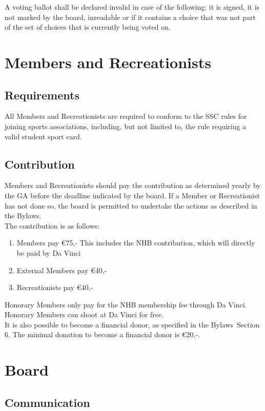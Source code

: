 \documentclass[a4paper]{article}
\newcommand{\Asta}{Bylaws} %
\begin{document}
A voting ballot shall be declared invalid in case of the following: it is signed, it is not marked by the board, inreadable or if it contains a choice that was not part of the set of choices that is currently being voted on.

\section{Members and Recreationists}
\subsection{Requirements}
All Members and Recreationists are required to conform to the SSC rules for joining sports associations, including, but not limited to, the rule requiring a valid student sport card.

\subsection{Contribution}
Members and Recreationists should pay the contribution as determined yearly by the GA before the deadline indicated by the board. If a Member or Recreationist has not done so, the board is permitted to undertake the actions as described in the \Asta . \\

The contribution is as follows:
\begin{enumerate}
\item Members pay €75,- This includes the NHB contribution, which will directly be paid by Da Vinci
\item External Members pay €40,-
\item Recreationists pay €40,-
\end{enumerate}


Honorary Members only pay for the NHB membership fee through Da Vinci. Honorary Members can shoot at Da Vinci for free. \\

It is also possible to become a financial donor, as specified in the \Asta\ Section 6. The minimal donation to become a financial donor is €20,-.

\section{Board}
\subsection{Communication}
\end{document}
